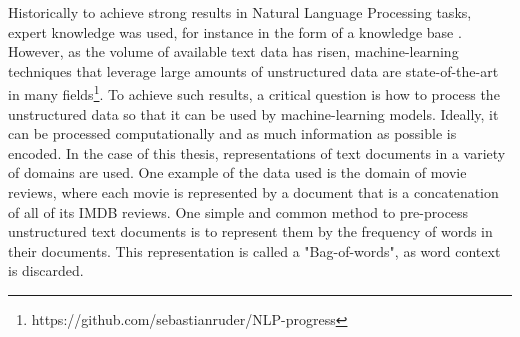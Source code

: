 Historically  to achieve strong results in Natural Language Processing tasks, expert knowledge was used, for instance in the form of a knowledge base \cite{Lewis1993}. However, as the volume of available text data has risen,  machine-learning techniques that leverage large amounts of unstructured data are  state-of-the-art in many fields\footnote{https://github.com/sebastianruder/NLP-progress}. To achieve such results, a critical question is how to process the unstructured data so that it can be used by machine-learning models. Ideally, it  can be processed computationally and as much information as possible is encoded. In the case of this thesis, representations of text documents in a variety of domains are used. One example of the data used is the domain of movie reviews, where each movie is represented by a document that is a concatenation of all of its IMDB reviews.    One simple and common method to pre-process unstructured text documents is to represent them by the frequency of words  in their documents. This  representation  is called a "Bag-of-words", as word context is discarded. %




